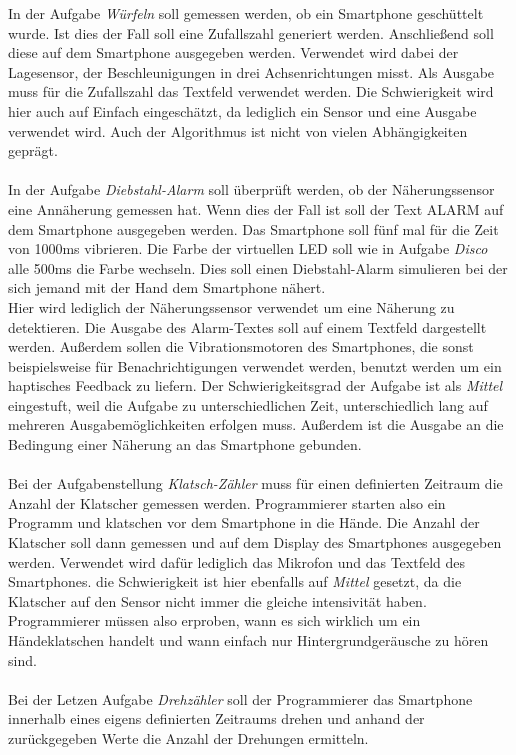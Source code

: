 \documentclass[11pt,a4paper]{report}
\begin{document}
In der Aufgabe \textit{Würfeln} soll gemessen werden, ob ein Smartphone geschüttelt wurde.
Ist dies der Fall soll eine Zufallszahl generiert werden.
Anschließend soll diese auf dem Smartphone ausgegeben werden.
Verwendet wird dabei der Lagesensor, der Beschleunigungen in drei Achsenrichtungen misst.
Als Ausgabe muss für die Zufallszahl das Textfeld verwendet werden.
Die Schwierigkeit wird hier auch auf Einfach eingeschätzt, da lediglich ein Sensor und eine Ausgabe verwendet wird.
Auch der Algorithmus ist nicht von vielen Abhängigkeiten geprägt.
\\\\
In der Aufgabe \textit{Diebstahl-Alarm} soll überprüft werden, ob der Näherungssensor eine Annäherung gemessen hat.
Wenn dies der Fall ist soll der Text \glqq ALARM\grqq{} auf dem Smartphone ausgegeben werden.
Das Smartphone soll fünf mal für die Zeit von 1000ms vibrieren.
Die Farbe der virtuellen LED soll wie in Aufgabe \textit{Disco} alle 500ms die Farbe wechseln.
Dies soll einen Diebstahl-Alarm simulieren bei der sich jemand mit der Hand dem Smartphone nähert.
\\
Hier wird lediglich der Näherungssensor verwendet um eine Näherung zu detektieren.
Die Ausgabe des Alarm-Textes soll auf einem Textfeld dargestellt werden.
Außerdem sollen die Vibrationsmotoren des Smartphones, die sonst beispielsweise für Benachrichtigungen verwendet werden, benutzt werden um ein haptisches Feedback zu liefern.
Der Schwierigkeitsgrad der Aufgabe ist als \textit{Mittel} eingestuft, weil die Aufgabe zu unterschiedlichen Zeit, unterschiedlich lang auf mehreren Ausgabemöglichkeiten erfolgen muss.
Außerdem ist die Ausgabe an die Bedingung einer Näherung an das Smartphone gebunden.
\\\\
Bei der Aufgabenstellung \textit{Klatsch-Zähler} muss für einen definierten Zeitraum die Anzahl der Klatscher gemessen werden.
Programmierer starten also ein Programm und klatschen vor dem Smartphone in die Hände.
Die Anzahl der Klatscher soll dann gemessen und auf dem Display des Smartphones ausgegeben werden.
Verwendet wird dafür lediglich das Mikrofon und das Textfeld des Smartphones.
die Schwierigkeit ist hier ebenfalls auf \textit{Mittel} gesetzt, da die Klatscher auf den Sensor nicht immer die gleiche intensivität haben.
Programmierer müssen also erproben, wann es sich wirklich um ein Händeklatschen handelt und wann einfach nur Hintergrundgeräusche zu hören sind.
\\\\
Bei der Letzen Aufgabe \textit{Drehzähler} soll der Programmierer das Smartphone innerhalb eines eigens definierten Zeitraums drehen und anhand der zurückgegeben Werte die Anzahl der Drehungen ermitteln.
\end{document}

